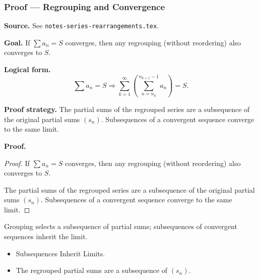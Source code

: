 
\clearpage
{}
\hypertarget{proof-RA-ABB-T-regrouping}{}

\subsubsection[Regrouping and Convergence]{Proof --- Regrouping and Convergence}

\bigskip

\noindent
\textbf{Source.} See \texttt{notes-series-rearrangements.tex}.

\vspace{0.75em}

\noindent
\textbf{Goal.} If $\sum a_n = S$ converges, then any regrouping (without reordering) also converges to $S$.

\vspace{0.75em}

\noindent
\textbf{Logical form.}
\[
  \sum a_n = S \Rightarrow \sum_{k=1}^\infty \left(\sum_{n=n_k}^{n_{k+1}-1} a_n\right) = S.
\]

\vspace{0.75em}

\noindent
\textbf{Proof strategy.} The partial sums of the regrouped series are a subsequence of the original partial sums $(s_n)$. Subsequences of a convergent sequence converge to the same limit.

\vspace{0.75em}

\noindent
\textbf{Proof.}
\begin{proof}
\Claim If $\sum a_n = S$ converges, then any regrouping (without reordering) also converges to $S$.

\Given 

\Goal 

\Strategy The partial sums of the regrouped series are a subsequence of the original partial sums $(s_n)$. Subsequences of a convergent sequence converge to the same limit.

\medskip


\end{proof}

\begin{remark*}
Grouping selects a subsequence of partial sums; subsequences of convergent sequences inherit the limit.
\end{remark*}

\begin{remark*}[Dependencies]
\begin{itemize}
  \item Subsequences Inherit Limits.
  \item The regrouped partial sums are a subsequence of $(s_n)$.
\end{itemize}
\end{remark*}
